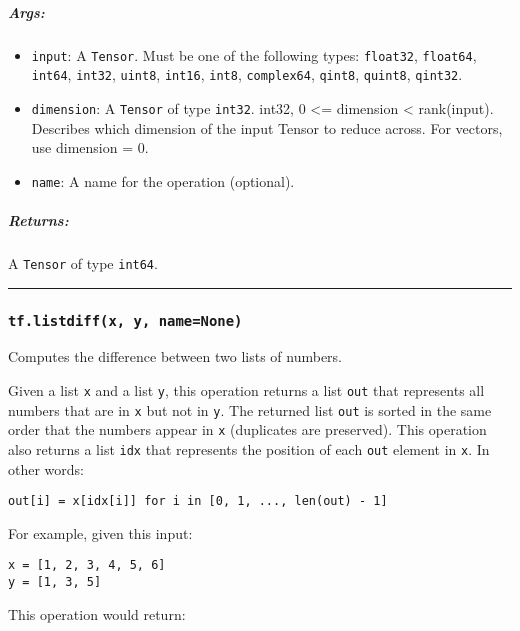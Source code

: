 \subparagraph{Args: }\label{args-55}

\begin{itemize}
\tightlist
\item
  \texttt{input}: A \texttt{Tensor}. Must be one of the following types:
  \texttt{float32}, \texttt{float64}, \texttt{int64}, \texttt{int32},
  \texttt{uint8}, \texttt{int16}, \texttt{int8}, \texttt{complex64},
  \texttt{qint8}, \texttt{quint8}, \texttt{qint32}.
\item
  \texttt{dimension}: A \texttt{Tensor} of type \texttt{int32}. int32, 0
  \textless{}= dimension \textless{} rank(input). Describes which
  dimension of the input Tensor to reduce across. For vectors, use
  dimension = 0.
\item
  \texttt{name}: A name for the operation (optional).
\end{itemize}

\subparagraph{Returns: }\label{returns-55}

A \texttt{Tensor} of type \texttt{int64}.

\begin{center}\rule{0.5\linewidth}{\linethickness}\end{center}

\subsubsection{\texorpdfstring{\texttt{tf.listdiff(x,\ y,\ name=None)}
}{tf.listdiff(x, y, name=None) }}\label{tf.listdiffx-y-namenone}

Computes the difference between two lists of numbers.

Given a list \texttt{x} and a list \texttt{y}, this operation returns a
list \texttt{out} that represents all numbers that are in \texttt{x} but
not in \texttt{y}. The returned list \texttt{out} is sorted in the same
order that the numbers appear in \texttt{x} (duplicates are preserved).
This operation also returns a list \texttt{idx} that represents the
position of each \texttt{out} element in \texttt{x}. In other words:

\texttt{out{[}i{]}\ =\ x{[}idx{[}i{]}{]}\ for\ i\ in\ {[}0,\ 1,\ ...,\ len(out)\ -\ 1{]}}

For example, given this input:

\begin{verbatim}
x = [1, 2, 3, 4, 5, 6]
y = [1, 3, 5]
\end{verbatim}

This operation would return:

